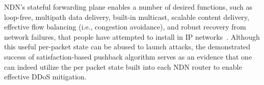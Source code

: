 NDN's stateful forwarding plane enables a number of desired functions, such as loop-free, multipath data delivery, built-in multicast, scalable content delivery, effective flow balancing (i.e., congestion avoidance), and robust recovery from network failures, that people have attempted to install in IP networks~\cite{adaptive-forwarding}. Although this useful per-packet state can be abused to launch attacks, the demonstrated success of satisfaction-based pushback algorithm serves as an evidence that one can indeed utilize the per packet state built into each NDN router to enable effective DDoS mitigation.  







